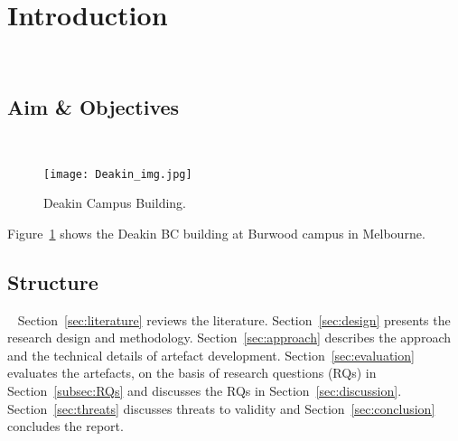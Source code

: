 \section{Introduction}~\label{sec:introduction}
\subsection{Aim \& Objectives}~\label{subsec:aims}

\begin{figure}[h]
    \centering
    \texttt{[image: Deakin\_img.jpg]}
    \caption{Deakin Campus Building.}
    \label{fig:building}
\end{figure}

Figure~\ref{fig:building} shows the Deakin BC building at Burwood campus in Melbourne.

\subsection{Structure}~\label{subsec:structure}
Section~\ref{sec:literature} reviews the literature. Section~\ref{sec:design} presents the research design and methodology. Section~\ref{sec:approach} describes the approach and the technical details of artefact development. Section~\ref{sec:evaluation} evaluates the artefacts, on the basis of research questions (RQs) in Section~\ref{subsec:RQs} and discusses the RQs in Section~\ref{sec:discussion}. Section~\ref{sec:threats} discusses threats to validity and Section~\ref{sec:conclusion} concludes the report. 